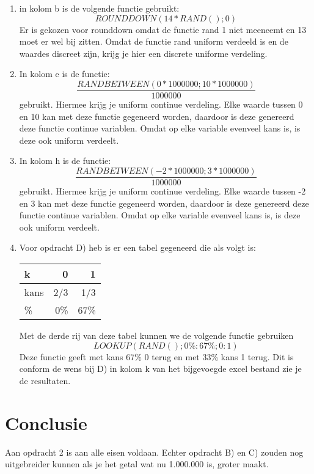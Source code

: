 \documentclass{article}
\begin{document}
\begin{enumerate}[label=(\Alph*)]
\item in kolom b is de volgende functie gebruikt: \begin{equation} ROUNDDOWN(14*RAND();0) \end{equation}  Er is gekozen voor rounddown omdat de functie rand 1 niet meeneemt en 13 moet er wel bij zitten. Omdat de functie rand uniform verdeeld is en de waardes discreet zijn, krijg je hier een discrete uniforme verdeling.
\item In kolom e is de functie:\begin{equation}  \frac{RANDBETWEEN(0*1000000;10*1000000)}{1000000} \end{equation} gebruikt. Hiermee krijg je uniform continue verdeling. Elke waarde tussen 0 en 10 kan met deze functie gegeneerd worden, daardoor is deze genereerd deze functie continue variablen. Omdat op elke variable evenveel kans is, is deze ook uniform verdeelt.
\item In kolom h is de functie: \begin{equation} \frac{RANDBETWEEN(-2*1000000;3*1000000)}{1000000} \end{equation} gebruikt. Hiermee krijg je uniform continue verdeling. Elke waarde tussen -2 en 3 kan met deze functie gegeneerd worden, daardoor is deze genereerd deze functie continue variablen. Omdat op elke variable evenveel kans is, is deze ook uniform verdeelt.
\item Voor opdracht D) heb is er een tabel gegeneerd die als volgt is:

\begin{table}[h]
  \begin{tabular}{|l|r|r|}
      \hline
      k & 0 & 1 \\ \hline
      kans & 2/3 & 1/3 \\ 
      \% & 0\% & 67\% \\ 
      \hline
  \end{tabular}
\end{table}

Met de derde rij van deze tabel kunnen we de volgende functie gebruiken \begin{equation} LOOKUP(RAND();0\%:67\%;0:1) \end{equation} Deze functie geeft met kans 67\% 0 terug en met 33\% kans 1 terug. Dit is conform de wens bij D) in kolom k van het bijgevoegde excel bestand zie je de resultaten.
\end{enumerate}

\section{Conclusie}
\label{subsec:sample_con}

Aan opdracht 2 is aan alle eisen voldaan. Echter opdracht B) en C) zouden nog uitgebreider kunnen als je het getal wat nu 1.000.000 is, groter maakt.
\end{document}
